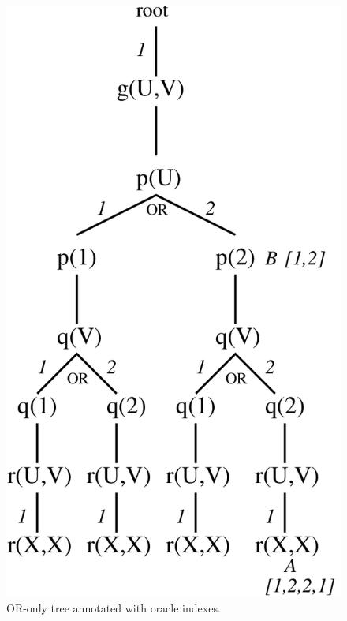 \documentclass[a4paper,11pt,twoside]{article}
\begin{document}
\begin{figure}
  \includegraphics[width=\linewidth]{or_only_tree.png}
  \caption{OR-only tree annotated with oracle indexes.}
  \label{or_only_tree}
\end{figure}
\end{document}
